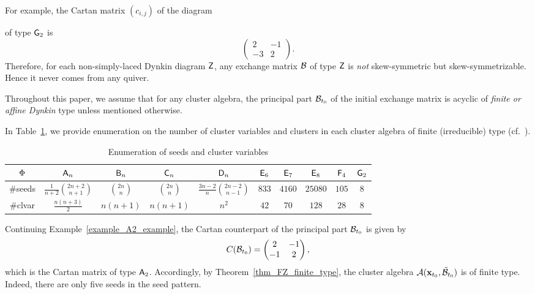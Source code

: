 For example, the Cartan matrix $(c_{i,j})$
of the diagram  of type
$\mathsf{G}_2$ is 
\begin{equation}\label{eq_Cartan_G2}
\begin{pmatrix}
2 & -1 \\
-3 & 2
\end{pmatrix}.
\end{equation}
Therefore, for each non-simply-laced Dynkin diagram $\mathsf{Z}$, any exchange matrix $\mathcal{B}$ of type $\mathsf{Z}$ is \emph{not} skew-symmetric but skew-symmetrizable. Hence it never comes from any quiver.

\begin{assumption}\label{assumption_finite}
Throughout this paper, we assume that for any cluster algebra, the principal part $\mathcal{B}_{t_0}$ of the initial exchange matrix is acyclic of \textit{finite or affine Dynkin} type unless mentioned otherwise. 
\end{assumption}

In Table~\ref{table_seeds_and_cluster_variables}, we provide enumeration on
the number of cluster variables and clusters in each cluster algebra of
finite (irreducible) type (cf.~\cite[Figure~5.17]{FWZ_chapter45}). 
\begin{table}[htb]
\setlength{\tabcolsep}{4pt}
	\begin{tabular}{c|ccccccccc}
		\toprule
		$\Phi$ & $\mathsf{A}_n$ & $\mathsf{B}_n$ & $\mathsf{C}_n$ & $\mathsf{D}_n$ & $\mathsf{E}_6$ & $\mathsf{E}_7$ & $\mathsf{E}_8$ & $\mathsf{F}_4$ & $\mathsf{G}_2$ \\
        \midrule
        $\#$seeds &  $\displaystyle \frac{1}{n+2}{\binom{2n+2}{n+1}}$ & $\displaystyle  \binom{2n}{n}$
        & $\displaystyle  \binom{2n}{n}$ & $\displaystyle  \frac{3n-2}{n} \binom{2n-2}{n-1}$ & $833$ & $4160$ & $25080$ & $105$ & $8$ \\[1.5em]
        $\#$clvar & $\displaystyle  \frac{n(n+3)}{2}$ & $n(n+1)$ & $n(n+1)$ & $n^2$ & $42$ & $70$ & $128$ & $28$ & $8$ \\
		\bottomrule 
	\end{tabular}
\caption{Enumeration of seeds and cluster variables}\label{table_seeds_and_cluster_variables}
\end{table}
\begin{example}\label{example_root_and_A2}
	Continuing Example~\ref{example_A2_example}, the Cartan
	counterpart of the principal part $\mathcal{B}_{t_0}$ is given by
	\[
		C(\mathcal{B}_{t_0}) = \begin{pmatrix}
			2 & -1  \\ -1 & 2
		\end{pmatrix},
	\]
	which is the Cartan matrix of type $\mathsf{A}_2$. 
	Accordingly, by Theorem~\ref{thm_FZ_finite_type}, the cluster algebra
	$\mathcal{A}(\mathbf{x}_{t_0}, \mathcal{\tilde{B}}_{t_0})$ is of finite type. Indeed, there are only five seeds in the seed pattern.
\end{example}


